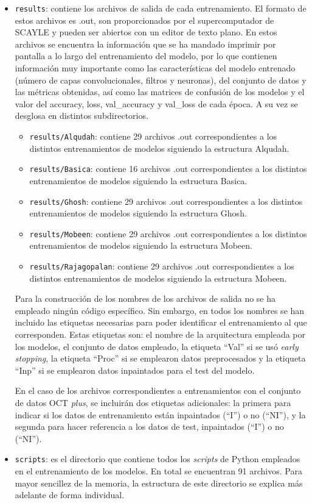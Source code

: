 \begin{itemize}
    \item \texttt{results}: contiene los archivos de salida de cada entrenamiento. El formato de estos archivos es .out, son proporcionados por el supercomputador de SCAYLE y pueden ser abiertos con un editor de texto plano. En estos archivos se encuentra la información que se ha mandado imprimir por pantalla a lo largo del entrenamiento del modelo, por lo que contienen información muy importante como las características del modelo entrenado (número de capas convolucionales, filtros y neuronas), del conjunto de datos y las métricas obtenidas, así como las matrices de confusión de los modelos y el valor del accuracy, loss, val\_accuracy y val\_loss de cada época. A su vez se desglosa en distintos subdirectorios.
    \begin{itemize}
        \item \texttt{results/Alqudah}: contiene 29 archivos .out correspondientes a los distintos entrenamientos de modelos siguiendo la estructura Alqudah.
        \item \texttt{results/Basica}: contiene 16 archivos .out correspondientes a los distintos entrenamientos de modelos siguiendo la estructura Basica.
        \item \texttt{results/Ghosh}: contiene 29 archivos .out correspondientes a los distintos entrenamientos de modelos siguiendo la estructura Ghosh.
        \item \texttt{results/Mobeen}: contiene 29 archivos .out correspondientes a los distintos entrenamientos de modelos siguiendo la estructura Mobeen.
        \item \texttt{results/Rajagopalan}: contiene 29 archivos .out correspondientes a los distintos entrenamientos de modelos siguiendo la estructura Mobeen.
    \end{itemize}
    Para la construcción de los nombres de los archivos de salida no se ha empleado ningún código específico. Sin embargo, en todos los nombres se han incluido las etiquetas necesarias para poder identificar el entrenamiento al que corresponden. Estas etiquetas son: el nombre de la arquitectura empleada por los modelos, el conjunto de datos empleado, la etiqueta ``Val'' si se usó \textit{early stopping}, la etiqueta ``Proc'' si se emplearon datos preprocesados y la etiqueta ``Inp'' si se emplearon datos inpaintados para el test del modelo. 

    En el caso de los archivos correspondientes a entrenamientos con el conjunto de datos OCT \textit{plus}, se incluirán dos etiquetas adicionales: la primera para indicar si los datos de entrenamiento están inpaintados (``I'') o no (``NI''), y la segunda para hacer referencia a los datos de test, inpaintados (``I'') o no (``NI'').
    \item \texttt{scripts}: es el directorio que contiene todos los \textit{scripts} de Python empleados en el entrenamiento de los modelos. En total se encuentran 91 archivos. Para mayor sencillez de la memoria, la estructura de este directorio se explica más adelante de forma individual.
\end{itemize}

